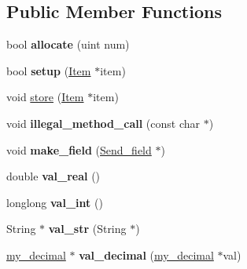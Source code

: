 \subsection*{Public Member Functions}
\begin{DoxyCompactItemize}
\item 
\mbox{\label{classItem__cache__row_a6865c45a15ef92faa1becffff2bbd4dd}} 
bool {\bfseries allocate} (uint num)
\item 
\mbox{\label{classItem__cache__row_a6fd8516fc8e0a636592978359f857c23}} 
bool {\bfseries setup} (\mbox{\hyperlink{classItem}{Item}} $\ast$item)
\item 
void \mbox{\hyperlink{classItem__cache__row_aa782d678a13a494afe3882ced878ee7c}{store}} (\mbox{\hyperlink{classItem}{Item}} $\ast$item)
\item 
\mbox{\label{classItem__cache__row_a1d1f655569460951dc7e5d4ce930d20a}} 
void {\bfseries illegal\+\_\+method\+\_\+call} (const char $\ast$)
\item 
\mbox{\label{classItem__cache__row_a1368563fc19907731b4d8f3605ad558b}} 
void {\bfseries make\+\_\+field} (\mbox{\hyperlink{classSend__field}{Send\+\_\+field}} $\ast$)
\item 
\mbox{\label{classItem__cache__row_a31dd5bdfe63f2998f820fe41456feb4d}} 
double {\bfseries val\+\_\+real} ()
\item 
\mbox{\label{classItem__cache__row_a63e233651211bb75a036629912e213c0}} 
longlong {\bfseries val\+\_\+int} ()
\item 
\mbox{\label{classItem__cache__row_a36773146939282fda23f44e1481f7baa}} 
String $\ast$ {\bfseries val\+\_\+str} (String $\ast$)
\item 
\mbox{\label{classItem__cache__row_a15891dc5f6e0c05c894c8d3baec30e22}} 
\mbox{\hyperlink{classmy__decimal}{my\+\_\+decimal}} $\ast$ {\bfseries val\+\_\+decimal} (\mbox{\hyperlink{classmy__decimal}{my\+\_\+decimal}} $\ast$val)
\item 
\mbox{\label{classItem__cache__row_ae2f077f82c56da46f820f152725548e4}} 

\end{DoxyCompactItemize}
